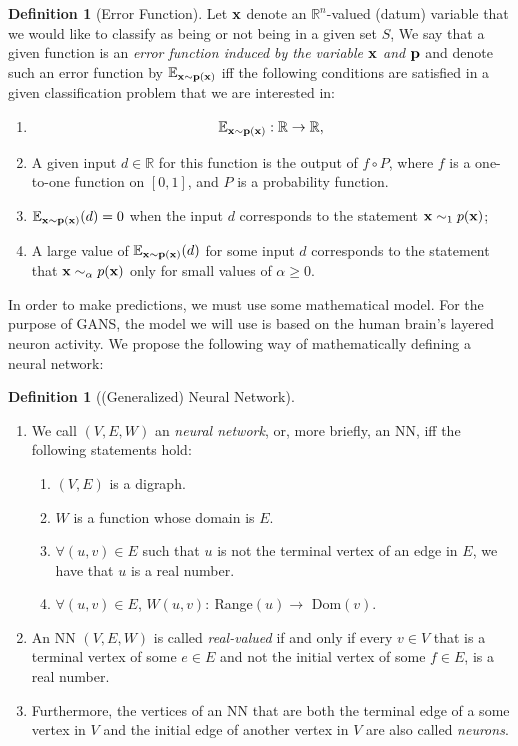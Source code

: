 \documentclass[12pt]{amsart}
\newcommand{\RR}{{\mathbb R}}
\newcommand{\EE}{{\mathbb E}}
\theoremstyle{definition}
\newtheorem{definition}[theorem]{Definition}
\theoremstyle{remark}
\begin{document}
\begin{definition}[Error Function] 
Let 
${\bf x }$ denote an $\RR^n$-valued (datum) variable that we would like to classify as being or not being in a given set $S$, We say that a given function is an {\em error function induced by the variable ${\bf x}$ and ${\bf p}$} and denote such 
an error function by $\EE_{{\bf x}\sim{\bf p}({\bf x})}$ iff the following 
conditions are satisfied in a given classification problem that we are 
interested in:
        \begin{enumerate}
                \item   \begin{align*}
                            \EE_{{\bf x}\sim {\bf p}({\bf x})} : \RR \to \RR,
                        \end{align*}
                \item A given input $d\in\RR$ for this function is the output of $f\circ P$, where $f$ is a one-to-one function on $[0,1]$, and $P$ is a probability function.
                \item $\EE_{{\bf x}\sim{\bf p}({\bf x})}(d)=0$ when the input $d$ corresponds to the statement ${\bf x}\sim_1 p({\bf x})$;
                \item  A large value of $\EE_{{\bf x}\sim{\bf p}({\bf x})}(d)$ for some input $d$ corresponds to the statement that ${\bf x}\sim_\alpha p({\bf x})$ only for small values of $\alpha\geq 0$.
        \end{enumerate}
\end{definition}



In order to make predictions, we must use some mathematical model. For the purpose of GANS, the model we will use is based on the human 
brain's layered neuron activity.  We propose the following way of mathematically defining a neural network:

\begin{definition}[(Generalized) Neural Network]
\begin{enumerate}
\item We call $(V,E,W)$ an {\em neural network}, or, more briefly, an NN, iff the following statements hold:
\begin{enumerate}
\item $(V,E)$ is a digraph.
\item $W$ is a function whose domain is $E$.
\item $\forall (u,v)\in E$ such that $u$ is not the terminal vertex of an edge in $E$, we have that $u$ is a real number.
\item $\forall (u,v)\in E$, $W(u,v):\ $Range$(u)\rightarrow$ Dom$(v)$.
\end{enumerate}
\item An NN $(V,E,W)$ is called {\em real-valued} if and only if every $v\in V$ that is a terminal vertex of some $e\in E$ and  not the initial vertex of some $f\in E$, is a real number.
\item Furthermore, the vertices of an NN that are both the terminal edge of a some vertex in $V$ and the initial edge of another vertex in $V$ are also called {\em neurons}.
\end{enumerate}
\end{definition}
\end{document}
